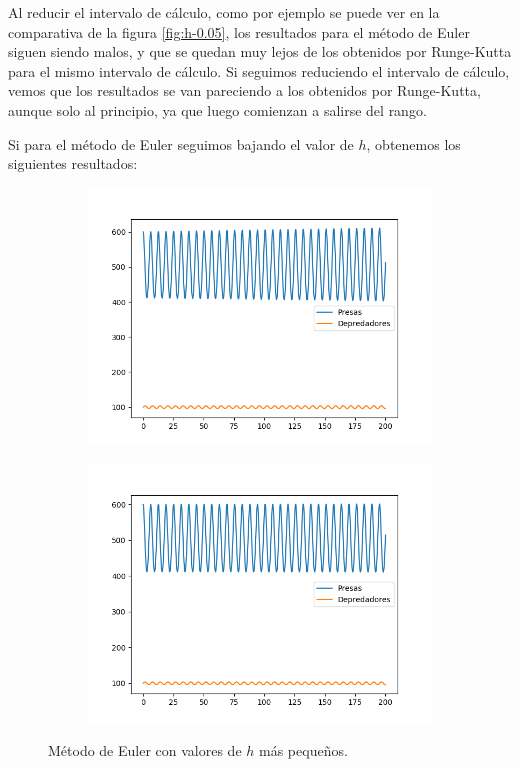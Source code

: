 \documentclass[11pt,a4paper]{article}
\begin{document}
Al reducir el intervalo de cálculo, como por ejemplo se puede ver en la comparativa de la
figura \ref{fig:h-0.05}, los resultados para el método de Euler siguen siendo malos,
y que se quedan muy lejos de los obtenidos por Runge-Kutta para el mismo intervalo de cálculo.
Si seguimos reduciendo el intervalo de cálculo, vemos que los resultados se van pareciendo
a los obtenidos por Runge-Kutta, aunque solo al principio, ya que luego comienzan a salirse
del rango.

Si para el método de Euler seguimos bajando el valor de $h$, obtenemos los siguientes
resultados:

\begin{figure}[H]
\centering
\begin{subfigure}{.5\textwidth}
	\centering
	\includegraphics[scale=0.45]{img/eu-0-001}
	\label{fig:eu-0.001}
\end{subfigure}%
\begin{subfigure}{.5\textwidth}
	\centering
	\includegraphics[scale=0.45]{img/eu-0-0001}
	\label{fig:eu-0.0001}
\end{subfigure}
\caption{Método de Euler con valores de $h$ más pequeños.}
\end{figure}
\end{document}
